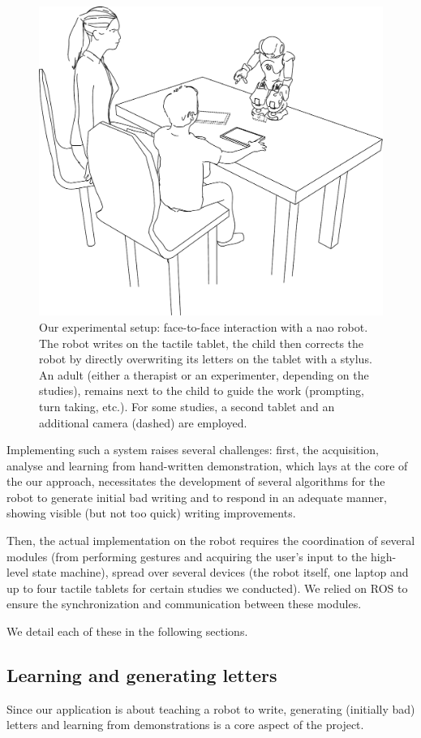 \documentclass{sig-alternate}
\begin{document}
   \begin{figure}
       \centering
       \includegraphics[width=0.6\columnwidth]{experimental_setup}
       \caption{\small Our experimental setup: face-to-face interaction with a {\sc
           nao} robot.  The robot writes on the tactile tablet, the child then
           corrects the robot by directly overwriting its letters on the tablet
           with a stylus. An adult (either a therapist or an experimenter,
           depending on the studies), remains next to the child to guide the work
           (prompting, turn taking, etc.). For some studies, a second tablet and an
           additional camera (dashed) are employed.}

   \end{figure}

Implementing such a system raises several challenges: first, the acquisition,
analyse and learning from hand-written demonstration, which lays at the core of the
our approach, necessitates the development of several algorithms for the robot to generate
initial bad writing and to respond in an adequate manner, showing visible (but
not too quick) writing improvements.

Then, the actual implementation on the robot requires the coordination of
several modules (from performing gestures and acquiring the user's input to
the high-level state machine), spread over several devices (the robot itself,
one laptop and up to four tactile tablets for certain studies we conducted). We
relied on ROS to ensure the synchronization and communication between these
modules.

We detail each of these in the following sections.

\subsection{Learning and generating letters}
Since our application is about teaching a robot to write, generating (initially
bad) letters and learning from demonstrations is a core aspect of the project.
\end{document}
